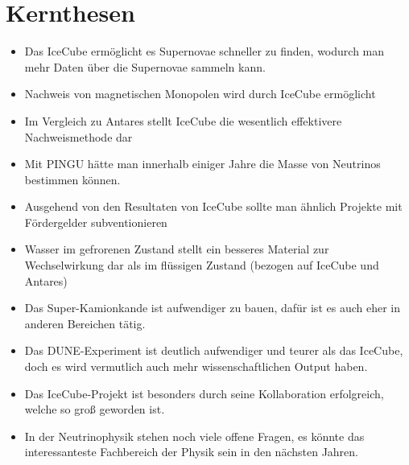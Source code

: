 \chapter*{Kernthesen} 

    \vspace{8pt}
    
    \begin{itemize}
    \item Das IceCube ermöglicht es Supernovae schneller zu finden, 
    wodurch man mehr Daten über die Supernovae sammeln kann.

    \item Nachweis von magnetischen Monopolen wird durch IceCube ermöglicht

    \item Im Vergleich zu Antares stellt IceCube die wesentlich effektivere Nachweismethode dar

    \item Mit PINGU hätte man innerhalb einiger Jahre die Masse von Neutrinos bestimmen können.

    \item Ausgehend von den Resultaten von IceCube sollte man ähnlich Projekte mit Fördergelder subventionieren

    \item Wasser im gefrorenen Zustand stellt ein besseres Material zur Wechselwirkung dar als im flüssigen Zustand (bezogen auf IceCube und Antares)
    
    \item Das Super-Kamionkande ist aufwendiger zu bauen, dafür ist es auch eher in anderen Bereichen tätig.
    
    \item Das DUNE-Experiment ist deutlich aufwendiger und teurer als das IceCube, doch es wird vermutlich auch
    mehr wissenschaftlichen Output haben.

    \item Das IceCube-Projekt ist besonders durch seine Kollaboration erfolgreich, welche so groß geworden ist.
    
    \item In der Neutrinophysik stehen noch viele offene Fragen, es könnte das interessanteste Fachbereich der Physik
    sein in den nächsten Jahren. 

    \end{itemize}
    
